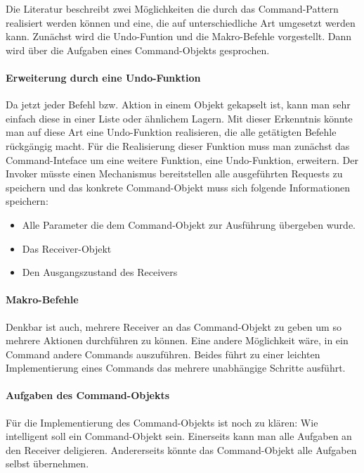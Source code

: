 Die Literatur beschreibt zwei  Möglichkeiten die  durch das Command-Pattern realisiert werden können und eine, die auf unterschiedliche Art umgesetzt werden kann. Zunächst wird die Undo-Funtion und die Makro-Befehle vorgestellt. Dann wird über die Aufgaben eines Command-Objekts gesprochen.

\paragraph{Erweiterung durch eine Undo-Funktion} Da jetzt jeder Befehl bzw. Aktion in einem Objekt gekapselt ist, kann man sehr einfach diese in einer Liste oder ähnlichem Lagern. Mit dieser Erkenntnis könnte man auf diese Art eine Undo-Funktion realisieren, die alle getätigten Befehle rückgängig macht. Für die Realisierung dieser Funktion muss man zunächst das Command-Inteface um eine weitere Funktion, eine Undo-Funktion, erweitern. Der Invoker müsste einen Mechanismus bereitstellen alle ausgeführten Requests zu speichern und das konkrete Command-Objekt muss sich folgende Informationen speichern:
\begin{itemize}
	\item Alle Parameter die dem Command-Objekt zur Ausführung übergeben wurde.
	\item Das Receiver-Objekt
	\item Den Ausgangszustand des Receivers
\end{itemize}

\paragraph{Makro-Befehle} Denkbar ist auch, mehrere Receiver an das Command-Objekt zu geben um so mehrere Aktionen durchführen zu können. Eine andere Möglichkeit wäre, in ein Command andere Commands auszuführen. Beides führt zu einer leichten Implementierung eines Commands das mehrere unabhängige Schritte ausführt.

\paragraph{Aufgaben des Command-Objekts} Für die Implementierung des Command-Objekts ist noch zu klären: Wie intelligent soll ein Command-Objekt sein. Einerseits kann man alle Aufgaben an den Receiver deligieren. Andererseits könnte das Command-Objekt alle Aufgaben selbst übernehmen. 
